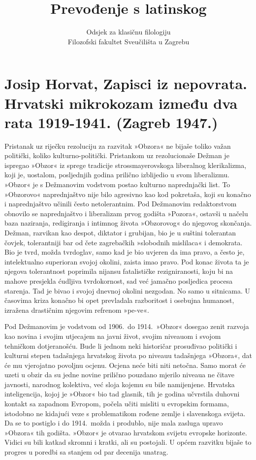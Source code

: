 \documentclass[a4paper,12pt,twoside]{report}
\newcommand{\subtitle}[1]{%
  \posttitle{%
    \par\end{center}
    \begin{center}\large#1\end{center}
    \vskip0.5em}%
}
\begin{document}
\title{Prevođenje s latinskog}
\subtitle{Primjeri hrvatske proze}
\author{Odsjek za klasičnu filologiju\\
Filozofski fakultet Sveučilišta u Zagrebu}
\maketitle

\clearpage
\thispagestyle{empty}




\chapter[Josip Horvat, Zapisci iz nepovrata]{Josip Horvat, Zapisci iz nepovrata. Hrvatski mikrokozam između dva rata 1919-1941. (Zagreb 1947.)}

Pristanak uz riječku rezoluciju za razvitak »Obzora« ne bijaše toliko važan politički, koliko kulturno-politički. Pristankom uz rezolucionaše Dežman je ispregao »Obzor« iz sprege tradicije strossmayerovskoga liberalnog klerikalizma, koji je, uostalom, posljednjih godina prilično izblijedio u svom liberalizmu. »Obzor« je s Dežmanovim vodstvom postao kulturno naprednjački list. To »Obzorovo« naprednjaštvo nije bilo agresivno kao kod pokretaša, koji su konačno i naprednjaštvo učinili često netolerantnim. Pod Dežmanovim redaktorstvom obnovilo se naprednjaštvo i liberalizam prvog godišta »Pozora«, ostavši u načelu baza naziranja, redigiranja i intimnog života »Obzorovog« do njegovog skončanja. Dežman, razvikan kao despot, diktator i grubijan, bio je u suštini tolerantan čovjek, tolerantniji bar od čete zagrebačkih »slobodnih mislilaca« i demokrata. Bio je tvrd, možda tvrdoglav, samo kad je bio uvjeren da ima pravo, a često je, intelektualno superioran svojoj okolini, zaista imao pravo. Pod konac života ta je njegova tolerantnost poprimila nijansu fatalističke rezigniranosti, koju bi na mahove presjekla ćudljiva tvrdokornost, sad već jamačno posljedica procesa starenja. Tad je bivao i svojoj dnevnoj okolini nezgodan. No samo u sitnicama. U časovima kriza konačno bi opet prevladala razboritost i osebujna humanost, izražena drastičnim njegovim refrenom »pe-ve«.

Pod Dežmanovim je vodstvom od 1906.\ do 1914.\ »Obzor« dosegao zenit razvoja kao novina i svojim utjecajem na javni život, svojim niveauom i svojom tehničkom dotjeranošću. Bude li jednom neki historičar prosuđivao politički i kulturni stepen tadašnjega hrvatskog života po niveauu tadašnjega »Obzora«, dat će mu vjerojatno povoljnu ocjenu. Ocjena neće biti niti netočna. Samo morat će uzeti u obzir da su jedne novine prilično pouzdano mjerilo niveaua ne čitave javnosti, narodnog kolektiva, već sloja kojemu su bile namijenjene. Hrvatska inteligencija, kojoj je »Obzor« bio tad glasnik, tih je godina učvrstila duhovni kontakt sa zapadnom Evropom, počela učiti misliti u evropskim formama, istodobno ne kidajući veze s problematikom rođene zemlje i slavenskoga svijeta. Da se to postiglo i do 1914.\ možda i produblo, nije mala zasluga upravo »Obzora« tih godišta. »Obzor« je otvarao hrvatskom svijetu evropske horizonte. Vidici su bili katkad skromni i kratki, ali su postojali. U općem razvitku bijaše to progres u poredbi sa stanjem od par decenija unatrag.
\end{document}
